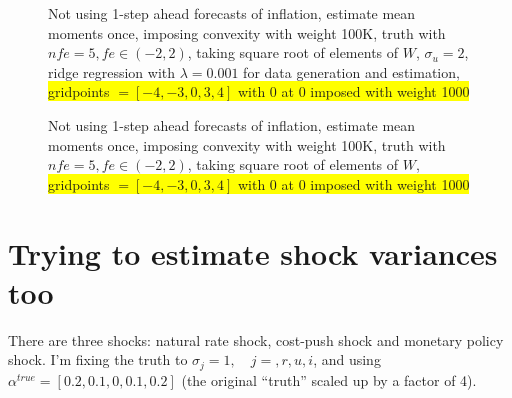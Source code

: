 \documentclass[11pt]{article}
\def \myFigPath {../../figures/}
\renewcommand{\[}{\begin{equation}}
\renewcommand{\]}{\end{equation}}
\begin{document}
\begin{figure}[h!]
\caption{Not using 1-step ahead forecasts of inflation, estimate mean moments once, imposing convexity with weight 100K, truth with $nfe=5, fe \in(-2,2)$, taking square root of elements of $W$, $\sigma_u=2$, ridge regression with $\lambda=0.001$ for data generation and estimation, \colorbox{yellow}{gridpoints $= [-4,-3,0,3,4]$ with 0 at 0 imposed with weight 1000} }
\end{figure}

\begin{figure}[h!]
\caption{Not using 1-step ahead forecasts of inflation, estimate mean moments once, imposing convexity with weight 100K, truth with $nfe=5, fe \in(-2,2)$, taking square root of elements of $W$, \colorbox{yellow}{gridpoints $= [-4,-3,0,3,4]$ with 0 at 0 imposed with weight 1000} }
\end{figure}

\clearpage
\section{Trying to estimate shock variances too}
There are three shocks: natural rate shock, cost-push shock and monetary policy shock. I'm fixing the truth to $\sigma_j=1, \quad j=,r,u,i$, and using $\alpha^{true}=[0.2,0.1,0,0.1,0.2]$ (the original ``truth'' scaled up by a factor of 4).
\end{document}
